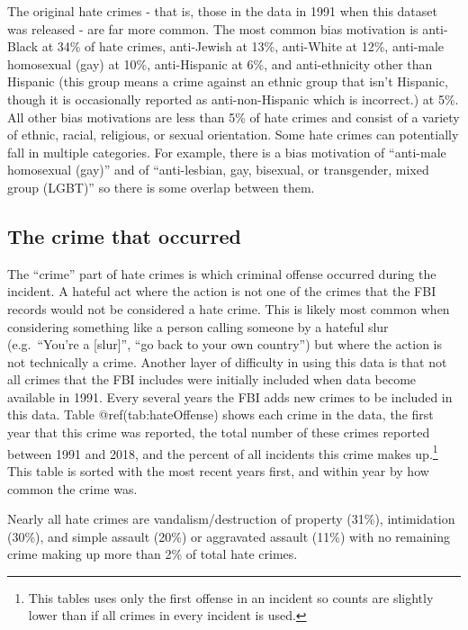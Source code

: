 \documentclass[
  12pt,
  openany]{book}
\begin{document}
The original hate crimes - that is, those in the data in 1991 when this dataset was released - are far more common. The most common bias motivation is anti-Black at 34\% of hate crimes, anti-Jewish at 13\%, anti-White at 12\%, anti-male homosexual (gay) at 10\%, anti-Hispanic at 6\%, and anti-ethnicity other than Hispanic (this group means a crime against an ethnic group that isn't Hispanic, though it is occasionally reported as anti-non-Hispanic which is incorrect.) at 5\%. All other bias motivations are less than 5\% of hate crimes and consist of a variety of ethnic, racial, religious, or sexual orientation. Some hate crimes can potentially fall in multiple categories. For example, there is a bias motivation of ``anti-male homosexual (gay)'' and of ``anti-lesbian, gay, bisexual, or transgender, mixed group (LGBT)'' so there is some overlap between them.

\hypertarget{the-crime-that-occurred}{%
\subsection{The crime that occurred}\label{the-crime-that-occurred}}

The ``crime'' part of hate crimes is which criminal offense occurred during the incident. A hateful act where the action is not one of the crimes that the FBI records would not be considered a hate crime. This is likely most common when considering something like a person calling someone by a hateful slur (e.g.~``You're a {[}slur{]}'', ``go back to your own country'') but where the action is not technically a crime. Another layer of difficulty in using this data is that not all crimes that the FBI includes were initially included when data become available in 1991. Every several years the FBI adds new crimes to be included in this data. Table @ref(tab:hateOffense) shows each crime in the data, the first year that this crime was reported, the total number of these crimes reported between 1991 and 2018, and the percent of all incidents this crime makes up.\footnote{This tables uses only the first offense in an incident so counts are slightly lower than if all crimes in every incident is used.} This table is sorted with the most recent years first, and within year by how common the crime was.

Nearly all hate crimes are vandalism/destruction of property (31\%), intimidation (30\%), and simple assault (20\%) or aggravated assault (11\%) with no remaining crime making up more than 2\% of total hate crimes.
\end{document}
